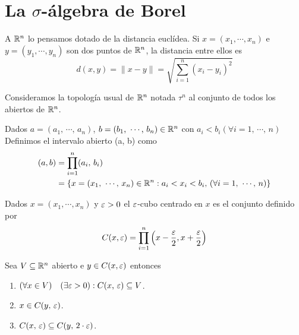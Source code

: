\section{La \(\sigma\)-álgebra de Borel}
\label{sec:borel}

A \(\mathbb{R}^n\) lo pensamos dotado de la distancia euclídea.
Si \(x = (x_1, \cdots, x_n)\) e \(y = (y_1, \cdots, y_n)\) son dos puntos de \(\mathbb{R}^n\), la distancia
entre ellos es
\begin{equation*}
    d(x, y) = \|x-y\| = \sqrt{ \sum_{i=1}^n (x_i - y_i)^2 }
\end{equation*}

Consideramos la topología usual de \(\mathbb{R}^n\) notada \(\tau^n\) al conjunto de todos los abiertos de \(\mathbb{R}^n\).

\begin{definition}
    Dados \(a = (a_1\text{, } \cdots\text{, } a_n)\), \(b = (b_1\text{, } \cdots\text{, } b_n) \in \mathbb{R}^n\) con \(a_i < b_i (\forall i = 1 \text{, } \cdots \text{, } n)\)
    Definimos el intervalo abierto (a, b) como
    \begin{align*}
        (a, b) & = \prod_{i=1}^n (a_i\text{, } b_i)                                                                                                \\
               & = \{ x = (x_1\text{, } \cdots \text{, } x_n) \in \mathbb{R}^n : a_i < x_i < b_i \text{, } (\forall i = 1 \text{, } \cdots \text{, } n) \}
    \end{align*}
\end{definition}

\begin{definition}[\(\e\)-cubo]
    Dados \(x= (x_1, \cdots, x_n)\) y \(\varepsilon > 0\) el \(\e\)-cubo centrado en \(x\) es el conjunto definido por
    \begin{equation*}
        C(x, \varepsilon) = \prod_{i = 1}^n \left(x - \frac{\varepsilon}{2}, x + \frac{\varepsilon}{2}\right)
    \end{equation*}
\end{definition}

\begin{prop}
    Sea \(V \subseteq \mathbb{R}^n\) abierto e \(y \in C(x, \varepsilon)\) entonces
    \begin{enumerate}
        \item \((\forall x \in V) \quad (\exists \varepsilon > 0) : C(x \text{, } \varepsilon) \subseteq V\).
        \item \(x \in C(y\text{, } \varepsilon)\).
        \item \(C(x\text{, } \varepsilon) \subseteq C(y\text{, } 2 \cdot \varepsilon)\).
    \end{enumerate}
\end{prop}

